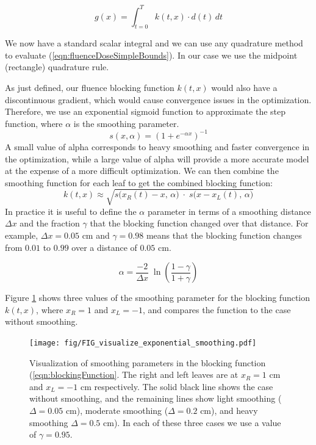 \documentclass{iopart}
\begin{document}
\begin{equation}
  g(x) = \int_{t=0}^T \! k(t, x) \cdot d(t) \, dt
  \label{eqn:fluenceDoseSimpleBounds}
\end{equation}

We now have a standard scalar integral and we can use any quadrature method to evaluate (\ref{eqn:fluenceDoseSimpleBounds}).
In our case we use the midpoint (rectangle) quadrature rule.

As just defined, our fluence blocking function $k(t,x)$
would also have a discontinuous gradient, which would cause convergence issues in the optimization.
Therefore, we use an exponential sigmoid function 
to approximate the step function, where $\alpha$ is the smoothing parameter. 
\begin{equation}
  s(x, \alpha) = (1 + e^{-\alpha x})^{-1}
  \label{eqn:sigmoidEquation}
\end{equation}
A small value of alpha corresponds to heavy smoothing and faster convergence in the optimization, while a large value of alpha will provide a more accurate model at the expense of a more difficult optimization.
We can then combine the smoothing function for each leaf to get the combined blocking function:
\begin{equation}
  k(t, x) \approx \sqrt{s\big(x_R(t) -x, \, \alpha\big) \; \cdot \; s\big(x -x_L(t), \, \alpha\big)}
  \label{eqn:blockingFunction}
\end{equation}
\noindent In practice it is useful to define the $\alpha$ parameter in terms of 
a smoothing distance $\Delta x$ and 
the fraction $\gamma$ that the blocking function changed over that distance.
For example, $\Delta x = 0.05$ cm and $\gamma = 0.98$ means that 
the blocking function changes from $0.01$ to $0.99$ over a distance of $0.05$ cm.


\begin{equation}
  \alpha = \frac{-2}{\Delta x} \; \ln \! \left( \frac{1 - \gamma}{1 + \gamma} \right)
  \label{eqn:SmoothingDistanceParameter}
\end{equation}

Figure \ref{fig:visualizeExponentialSmoothing} shows three values of the smoothing parameter for the blocking function $k(t, x)$, where $x_R = 1$ and $x_L = -1$, and compares the function to the case without smoothing.

\begin{figure}
  \centering
  \texttt{[image: fig/FIG\_visualize\_exponential\_smoothing.pdf]}
  \caption{Visualization of smoothing parameters in the blocking function (\ref{eqn:blockingFunction}. The right and left leaves are at $x_R = 1$ cm and $x_L = -1$ cm respectively. The solid black line shows the case without smoothing, and the remaining lines show light smoothing ($\Delta = 0.05$ cm), moderate smoothing ($\Delta = 0.2$ cm), and heavy smoothing $\Delta = 0.5$ cm). In each of these three cases we use a value of $\gamma = 0.95$.}
  \label{fig:visualizeExponentialSmoothing}
\end{figure}
\end{document}
